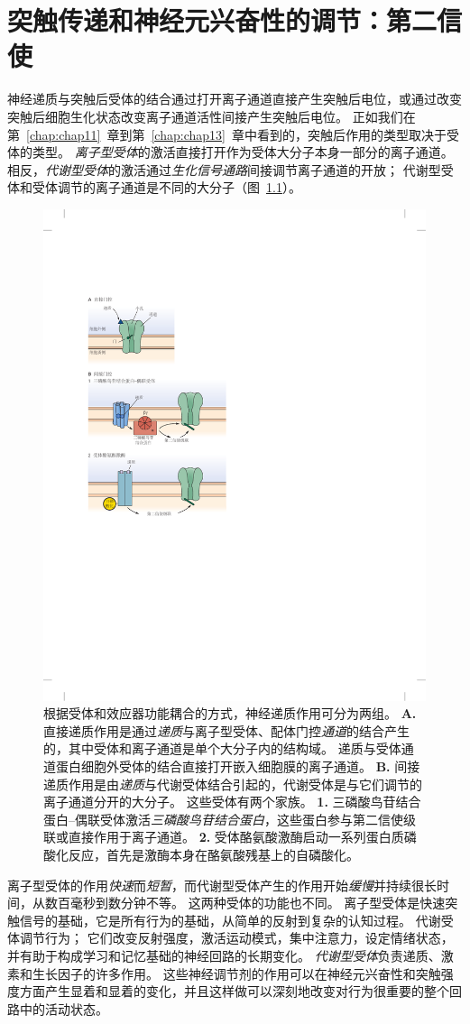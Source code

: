\chapter{突触传递和神经元兴奋性的调节：第二信使} \label{chap:chap14}

神经递质与突触后受体的结合通过打开离子通道直接产生突触后电位，或通过改变突触后细胞生化状态改变离子通道活性间接产生突触后电位。
正如我们在第~\ref{chap:chap11}~章到第~\ref{chap:chap13}~章中看到的，突触后作用的类型取决于受体的类型。
\textit{离子型受体}的激活直接打开作为受体大分子本身一部分的离子通道。
相反，\textit{代谢型受体}的激活通过\textit{生化信号通路}间接调节离子通道的开放；
代谢型受体和受体调节的离子通道是不同的大分子（图~\ref{fig:14_1}）。


\begin{figure}[htbp]
	\centering
	\includegraphics[width=0.5\linewidth]{chap14/fig_14_1}
	\caption{根据受体和效应器功能耦合的方式，神经递质作用可分为两组。
		\textbf{A.} 直接递质作用是通过\textit{递质}与离子型受体、配体门控\textit{通道}的结合产生的，其中受体和离子通道是单个大分子内的结构域。
		递质与受体通道蛋白细胞外受体的结合直接打开嵌入细胞膜的离子通道。
		\textbf{B.} 间接递质作用是由\textit{递质}与代谢受体结合引起的，代谢受体是与它们调节的离子通道分开的大分子。
		这些受体有两个家族。
		\textbf{1.} 三磷酸鸟苷结合蛋白–偶联受体激活\textit{三磷酸鸟苷结合蛋白}，这些蛋白参与第二信使级联或直接作用于离子通道。
		\textbf{2.} 受体酪氨酸激酶启动一系列蛋白质磷酸化反应，首先是激酶本身在酪氨酸残基上的自磷酸化。}
	\label{fig:14_1}
\end{figure}


离子型受体的作用\textit{快速}而\textit{短暂}，而代谢型受体产生的作用开始\textit{缓慢}并持续很长时间，从数百毫秒到数分钟不等。
这两种受体的功能也不同。
离子型受体是快速突触信号的基础，它是所有行为的基础，从简单的反射到复杂的认知过程。
代谢受体调节行为；
它们改变反射强度，激活运动模式，集中注意力，设定情绪状态，并有助于构成学习和记忆基础的神经回路的长期变化。
\textit{代谢型受体}负责递质、激素和生长因子的许多作用。
这些神经调节剂的作用可以在神经元兴奋性和突触强度方面产生显着和显着的变化，并且这样做可以深刻地改变对行为很重要的整个回路中的活动状态。


